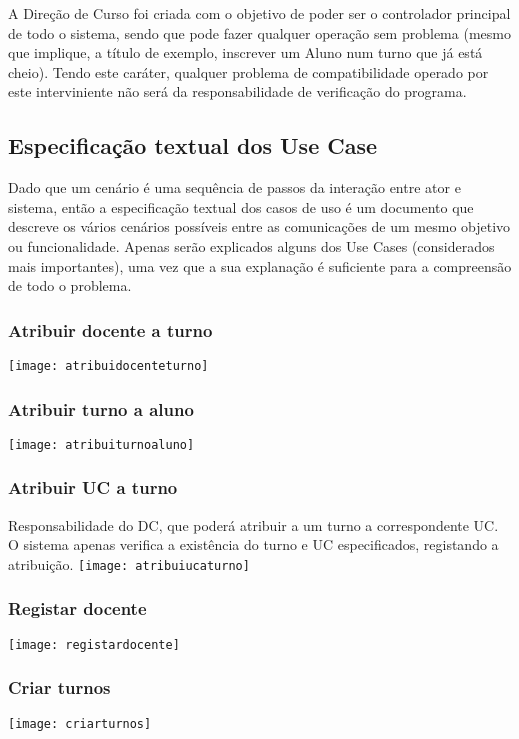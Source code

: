 \documentclass[a4paper]{article}
\begin{document}
A Direção de Curso foi criada com o objetivo de poder ser o controlador principal de todo o sistema, sendo que pode fazer qualquer operação sem problema (mesmo que implique, a título de exemplo, inscrever um Aluno num turno que já está cheio). Tendo este caráter, qualquer problema de compatibilidade operado por este interviniente não será da responsabilidade de verificação do programa.

\subsection{Especificação textual dos Use Case}
Dado que um cenário é uma sequência de passos da interação entre ator e sistema, então a especificação textual dos casos de uso é um documento que descreve os vários cenários possíveis entre as comunicações de um mesmo objetivo ou funcionalidade. Apenas serão explicados alguns dos Use Cases (considerados mais importantes), uma vez que a sua explanação é suficiente para a compreensão de todo o problema.

\subsubsection{Atribuir docente a turno}
\texttt{[image: atribuidocenteturno]}\break

\subsubsection{Atribuir turno a aluno}
\texttt{[image: atribuiturnoaluno]}\break

\subsubsection{Atribuir UC a turno}
Responsabilidade do DC, que poderá atribuir a um turno a correspondente UC. O sistema apenas verifica a existência do turno e UC especificados, registando a atribuição.
\texttt{[image: atribuiucaturno]}\break

\subsubsection{Registar docente}
\texttt{[image: registardocente]}\break

\subsubsection{Criar turnos}
\texttt{[image: criarturnos]}\break
\end{document}
